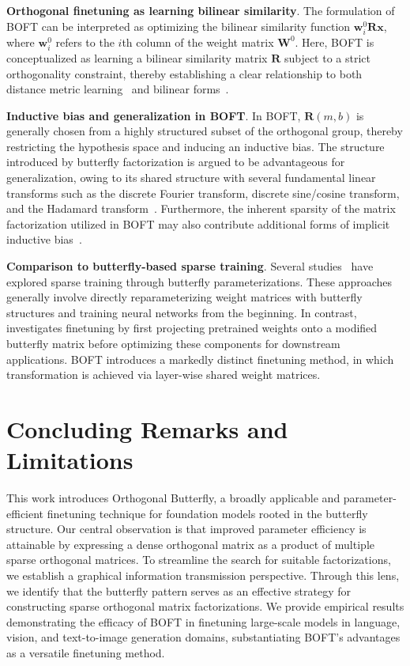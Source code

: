 \textbf{Orthogonal finetuning as learning bilinear similarity}. The formulation of BOFT can be interpreted as optimizing the bilinear similarity function $\bm{w}^0_i\bm{R}\bm{x}$, where $\bm{w}^0_i$ refers to the $i$th column of the weight matrix $\bm{W}^0$. Here, BOFT is conceptualized as learning a bilinear similarity matrix $\bm{R}$ subject to a strict orthogonality constraint, thereby establishing a clear relationship to both distance metric learning~\cite{xing2002distance} and bilinear forms~\cite{roman2005advanced}.

\textbf{Inductive bias and generalization in BOFT}. In BOFT, $\bm{R}(m,b)$ is generally chosen from a highly structured subset of the orthogonal group, thereby restricting the hypothesis space and inducing an inductive bias. The structure introduced by butterfly factorization is argued to be advantageous for generalization, owing to its shared structure with several fundamental linear transforms such as the discrete Fourier transform, discrete sine/cosine transform, and the Hadamard transform~\cite{dao2019kaleidoscope}. Furthermore, the inherent sparsity of the matrix factorization utilized in BOFT may also contribute additional forms of implicit inductive bias~\cite{gunasekar2017implicit,li2018algorithmic,liu2019neural}.

\textbf{Comparison to butterfly-based sparse training}. Several studies~\cite{dao2019learning,dao2019kaleidoscope,chen2022pixelated,dao2022monarch} have explored sparse training through butterfly parameterizations. These approaches generally involve directly reparameterizing weight matrices with butterfly structures and training neural networks from the beginning. In contrast, \cite{dao2022monarch} investigates finetuning by first projecting pretrained weights onto a modified butterfly matrix before optimizing these components for downstream applications. BOFT introduces a markedly distinct finetuning method, in which transformation is achieved via layer-wise shared weight matrices.



\section{Concluding Remarks and Limitations}

This work introduces Orthogonal Butterfly, a broadly applicable and parameter-efficient finetuning technique for foundation models rooted in the butterfly structure. Our central observation is that improved parameter efficiency is attainable by expressing a dense orthogonal matrix as a product of multiple sparse orthogonal matrices. To streamline the search for suitable factorizations, we establish a graphical information transmission perspective. Through this lens, we identify that the butterfly pattern serves as an effective strategy for constructing sparse orthogonal matrix factorizations. We provide empirical results demonstrating the efficacy of BOFT in finetuning large-scale models in language, vision, and text-to-image generation domains, substantiating BOFT’s advantages as a versatile finetuning method.

